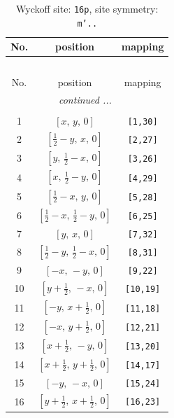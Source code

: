 \documentclass[fleqn,8pt]{jsarticle}
\begin{document}
\begin{longtable}{ccc}
\caption{Wyckoff site: {\tt 16p}, site symmetry: {\tt m'..}}
 \\
 \hline \hline
No. & position & mapping \\ \hline \endfirsthead

\multicolumn{2}{l}{\tablename\ \thetable{}} \\
 \hline \hline
No. & position & mapping \\ \hline \endhead

 \hline \hline
\multicolumn{2}{r}{\footnotesize\it continued ...} \\ \endfoot

 \hline \hline
\multicolumn{2}{r}{} \\ \endlastfoot

1 & $\left[ x,\, y,\, 0 \right]$ & {\tt [1,30]} \\ \hline
2 & $\left[ \frac{1}{2} - y,\, x,\, 0 \right]$ & {\tt [2,27]} \\ \hline
3 & $\left[ y,\, \frac{1}{2} - x,\, 0 \right]$ & {\tt [3,26]} \\ \hline
4 & $\left[ x,\, \frac{1}{2} - y,\, 0 \right]$ & {\tt [4,29]} \\ \hline
5 & $\left[ \frac{1}{2} - x,\, y,\, 0 \right]$ & {\tt [5,28]} \\ \hline
6 & $\left[ \frac{1}{2} - x,\, \frac{1}{2} - y,\, 0 \right]$ & {\tt [6,25]} \\ \hline
7 & $\left[ y,\, x,\, 0 \right]$ & {\tt [7,32]} \\ \hline
8 & $\left[ \frac{1}{2} - y,\, \frac{1}{2} - x,\, 0 \right]$ & {\tt [8,31]} \\ \hline
9 & $\left[ - x,\, - y,\, 0 \right]$ & {\tt [9,22]} \\ \hline
10 & $\left[ y + \frac{1}{2},\, - x,\, 0 \right]$ & {\tt [10,19]} \\ \hline
11 & $\left[ - y,\, x + \frac{1}{2},\, 0 \right]$ & {\tt [11,18]} \\ \hline
12 & $\left[ - x,\, y + \frac{1}{2},\, 0 \right]$ & {\tt [12,21]} \\ \hline
13 & $\left[ x + \frac{1}{2},\, - y,\, 0 \right]$ & {\tt [13,20]} \\ \hline
14 & $\left[ x + \frac{1}{2},\, y + \frac{1}{2},\, 0 \right]$ & {\tt [14,17]} \\ \hline
15 & $\left[ - y,\, - x,\, 0 \right]$ & {\tt [15,24]} \\ \hline
16 & $\left[ y + \frac{1}{2},\, x + \frac{1}{2},\, 0 \right]$ & {\tt [16,23]} \\
\end{longtable}
\end{document}
